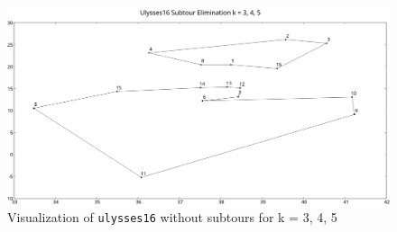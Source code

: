\documentclass[12pt,letterpaper]{article}
\begin{document}
\begin{enumerate}
      \begin{figure}
        \includegraphics[width=\textwidth]{distances/ulysses16_subtours_elimination_k.png}
        \caption{Visualization of \texttt{ulysses16} without subtours for k = 3, 4, 5}
        \label{fig:ulysses16eliminationk}
      \end{figure}
  \end{enumerate}
\end{document}
